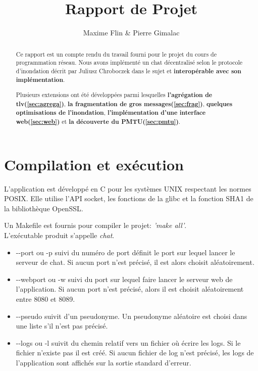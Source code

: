 \documentclass[a4paper,10pt]{article} %
\author{Maxime Flin \& Pierre Gimalac}
\title{Rapport de Projet}
\begin{document}
\maketitle

\begin{abstract}
  Ce rapport est un compte rendu du travail fourni pour le projet du cours de programmation réseau. Nous avons implémenté un chat décentralisé selon le protocole d'inondation décrit par Juliusz Chroboczek dans le sujet et \textbf{interopérable avec son implémentation}.

  Plusieurs extensions ont été développées parmi lesquelles \textbf{l'agrégation de tlv(\ref{sec:agrega})}, \textbf{la fragmentation de gros messages(\ref{sec:frag})}, \textbf{quelques optimisations de l’inondation}, \textbf{l'implémentation d'une interface web(\ref{sec:web})} et \textbf{la découverte du PMTU(\ref{sec:pmtu})}.
\end{abstract}

\section{Compilation et exécution\label{sec:exec}}
L'application est développé en C pour les systèmes UNIX respectant les normes POSIX. Elle utilise l'API socket, les fonctions de la \textrm{glibc} et la fonction \textrm{SHA1} de la bibliothèque \textrm{OpenSSL}.

Un \textrm{Makefile} est fournis pour compiler le projet:  \textit{'make all'}.\\

L'exécutable produit s'appelle \textit{chat}.
\begin{itemize}
\item \textrm{-{}-port} ou \textrm{-p} suivi du numéro de port définit le port sur lequel lancer le serveur de chat. Si aucun port n'est précisé, il est alors choisit aléatoirement.
\item \textrm{-{}-webport} ou \textrm{-w} suivi du port sur lequel faire lancer le serveur web de l'application. Si aucun port n'est précisé, alors il est choisit aléatoirement entre 8080 et 8089.
\item \textrm{-{}-pseudo} suivit d'un pseudonyme. Un pseudonyme aléatoire est choisi dans une liste s'il n'est pas précisé.
\item \textrm{-{}-logs} ou \textrm{-l} suivit du chemin relatif vers un fichier où écrire les logs. Si le fichier n'existe pas il est créé. Si aucun fichier de log n'est précisé, les logs de l'application sont affichés sur la sortie standard d'erreur.
\end{itemize}
\end{document}
